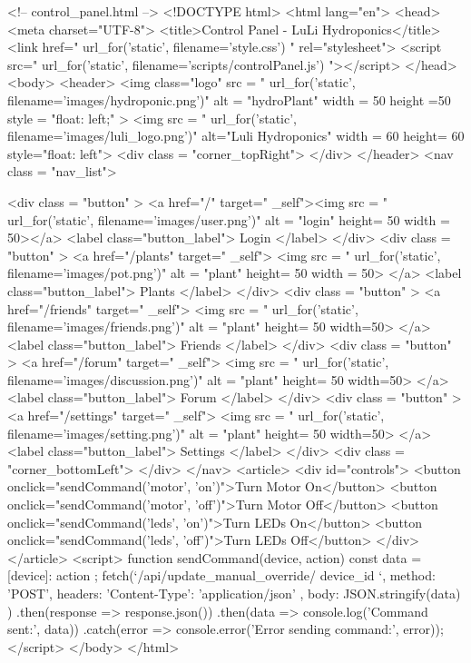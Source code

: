 \documentclass[12pt]{article} %
\begin{document}
\pagebreak
\begin{htmlcode}[caption={Control Panel Html}]

<!-- control_panel.html -->
<!DOCTYPE html>
<html lang="en">
<head>
<meta charset="UTF-8">
<title>Control Panel - LuLi Hydroponics</title>
<link href="{{ url_for('static', filename='style.css') }}" rel="stylesheet">
<script src="{{ url_for('static', filename='scripts/controlPanel.js') }}"></script>
</head>
<body>
<header>
    <img class="logo" src = "{{ url_for('static', filename='images/hydroponic.png')}}" alt = "hydroPlant"  width = 50 height =50 style = "float: left;" >   
    <img src = "{{ url_for('static', filename='images/luli_logo.png')}}" alt="Luli Hydroponics" width = 60 height= 60 style="float: left">
    <div class = "corner_topRight"> </div>
</header>
<nav class = "nav_list">
      
    <div class = "button" > 
       <a href="/" target=" _self"><img src = "{{ url_for('static', filename='images/user.png')}}" alt = "login" height= 50 width = 50></a>
       <label class="button_label"> Login </label> 
    </div>
    <div class = "button" > 
       <a href="/plants" target=" _self"> <img src = "{{ url_for('static', filename='images/pot.png')}}" alt = "plant" height= 50 width = 50> </a>
       <label class="button_label"> Plants </label> 
    </div>
    <div class = "button" > 
       <a href="/friends" target=" _self"> <img src = "{{ url_for('static', filename='images/friends.png')}}" alt = "plant" height= 50 width=50> </a>
       <label class="button_label"> Friends </label> 
    </div>
    <div class = "button" > 
       <a href="/forum" target=" _self"> <img src = "{{ url_for('static', filename='images/discussion.png')}}" alt = "plant" height= 50 width=50> </a>
       <label class="button_label"> Forum </label> 
    </div>
    <div class = "button" > 
       <a href="/settings" target=" _self"> <img src = "{{ url_for('static', filename='images/setting.png')}}" alt = "plant" height= 50 width=50> </a>
       <label class="button_label"> Settings </label> 
    </div>
       <div class = "corner_bottomLeft"> </div>
   </nav>
<article>
    <div id="controls">
        <button onclick="sendCommand('motor', 'on')">Turn Motor On</button>
        <button onclick="sendCommand('motor', 'off')">Turn Motor Off</button>
        <button onclick="sendCommand('leds', 'on')">Turn LEDs On</button>
        <button onclick="sendCommand('leds', 'off')">Turn LEDs Off</button>
    </div>
</article>
<script>
    function sendCommand(device, action) {
        const data = { [device]: action };
        fetch(`/api/update_manual_override/{{ device_id }}`, {
            method: 'POST',
            headers: { 'Content-Type': 'application/json' },
            body: JSON.stringify(data)
        })
        .then(response => response.json())
        .then(data => console.log('Command sent:', data))
        .catch(error => console.error('Error sending command:', error));
    }
</script>
</body>
</html>
\end{htmlcode}
\end{document}
